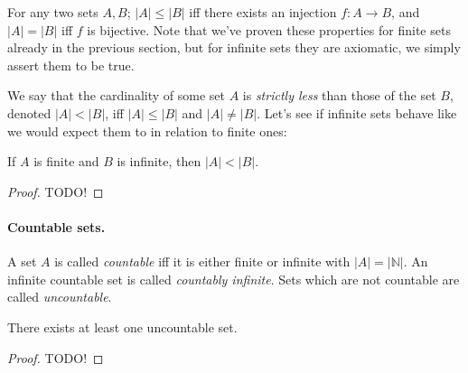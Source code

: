 \documentclass[nobib,nofonts]{tufte-handout}
\begin{document}
For any two sets $A, B$; $|A| \leq |B|$ iff there exists an injection $f:A \rightarrow B$, and $|A| = |B|$ iff $f$ is bijective.
Note that we've proven these properties for finite sets already in the previous section, but for infinite sets they are axiomatic, we simply assert them to be true.

We say that the cardinality of some set $A$ is \emph{strictly less} than those of the set $B$, denoted $|A| < |B|$, iff $|A| \leq |B|$ and $|A| \neq |B|$.
Let's see if infinite sets behave like we would expect them to in relation to finite ones:

\begin{proposition}
  If $A$ is finite and $B$ is infinite, then $|A| < |B|$.
\end{proposition}

\begin{proof}
TODO!
\end{proof}

\paragraph{Countable sets.}

A set $A$ is called \emph{countable} iff it is either finite or infinite with $|A| = |\mathbb{N}|$.
An infinite countable set is called \emph{countably infinite}.
Sets which are not countable are called \emph{uncountable}.

\begin{proposition}
  There exists at least one uncountable set.
\end{proposition}

\begin{proof}
TODO!
\end{proof}
\end{document}
